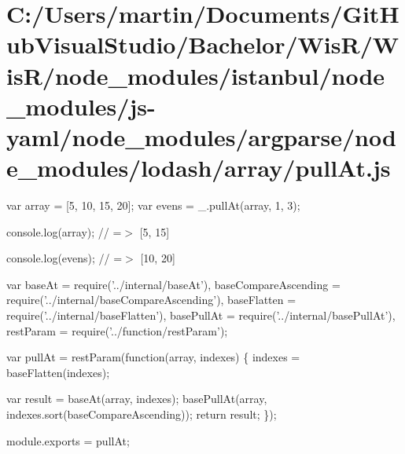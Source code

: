 \hypertarget{_c_1_2_users_2martin_2_documents_2_git_hub_visual_studio_2_bachelor_2_wis_r_2_wis_r_2node_module0049ed8386dba79d0173ca1815b75768}{}\section{C\+:/\+Users/martin/\+Documents/\+Git\+Hub\+Visual\+Studio/\+Bachelor/\+Wis\+R/\+Wis\+R/node\+\_\+modules/istanbul/node\+\_\+modules/js-\/yaml/node\+\_\+modules/argparse/node\+\_\+modules/lodash/array/pull\+At.\+js}
var array = \mbox{[}5, 10, 15, 20\mbox{]}; var evens = \+\_\+.\+pull\+At(array, 1, 3);

console.\+log(array); // =$>$ \mbox{[}5, 15\mbox{]}

console.\+log(evens); // =$>$ \mbox{[}10, 20\mbox{]}


\begin{DoxyCodeInclude}
var baseAt = require(\textcolor{stringliteral}{'../internal/baseAt'}),
    baseCompareAscending = require(\textcolor{stringliteral}{'../internal/baseCompareAscending'}),
    baseFlatten = require(\textcolor{stringliteral}{'../internal/baseFlatten'}),
    basePullAt = require(\textcolor{stringliteral}{'../internal/basePullAt'}),
    restParam = require(\textcolor{stringliteral}{'../function/restParam'});

var pullAt = restParam(\textcolor{keyword}{function}(array, indexes) \{
  indexes = baseFlatten(indexes);

  var result = baseAt(array, indexes);
  basePullAt(array, indexes.sort(baseCompareAscending));
  \textcolor{keywordflow}{return} result;
\});

module.exports = pullAt;
\end{DoxyCodeInclude}
 